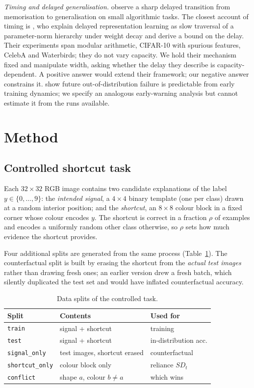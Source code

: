 \documentclass[conference]{IEEEtran}
\begin{document}
\textit{Timing and delayed generalisation.} \cite{power2022grokking} observe a sharp
delayed transition from memorisation to generalisation on small algorithmic tasks. The
closest account of timing is \cite{nht2026}, who explain delayed representation learning as
slow traversal of a parameter-norm hierarchy under weight decay and derive a bound on the
delay. Their experiments span modular arithmetic, CIFAR-10 with spurious features, CelebA
and Waterbirds; they do not vary capacity. We hold their mechanism fixed and manipulate
width, asking whether the delay they describe is capacity-dependent. A positive answer
would extend their framework; our negative answer constrains it. \cite{ood2026} show future
out-of-distribution failure is predictable from early training dynamics; we specify an
analogous early-warning analysis but cannot estimate it from the runs available.

\section{Method}

\subsection{Controlled shortcut task}

Each $32\times32$ RGB image contains two candidate explanations of the label
$y\in\{0,\dots,9\}$: the \emph{intended signal}, a $4\times4$ binary template (one per
class) drawn at a random interior position; and the \emph{shortcut}, an $8\times8$ colour
block in a fixed corner whose colour encodes $y$. The shortcut is correct in a fraction
$\rho$ of examples and encodes a uniformly random other class otherwise, so $\rho$ sets how
much evidence the shortcut provides.

Four additional splits are generated from the same process (Table~\ref{tab:splits}). The
counterfactual split is built by erasing the shortcut from the \emph{actual test images}
rather than drawing fresh ones; an earlier version drew a fresh batch, which silently
duplicated the test set and would have inflated counterfactual accuracy.

\begin{table}[t]
\centering
\caption{Data splits of the controlled task.}
\label{tab:splits}
\scriptsize
\begin{tabular}{@{}lll@{}}
\toprule
Split & Contents & Used for \\
\midrule
\texttt{train} & signal + shortcut & training \\
\texttt{test} & signal + shortcut & in-distribution acc. \\
\texttt{signal\_only} & test images, shortcut erased & counterfactual \\
\texttt{shortcut\_only} & colour block only & reliance $SD_t$ \\
\texttt{conflict} & shape $a$, colour $b\neq a$ & which wins \\
\bottomrule
\end{tabular}
\end{table}
\end{document}

